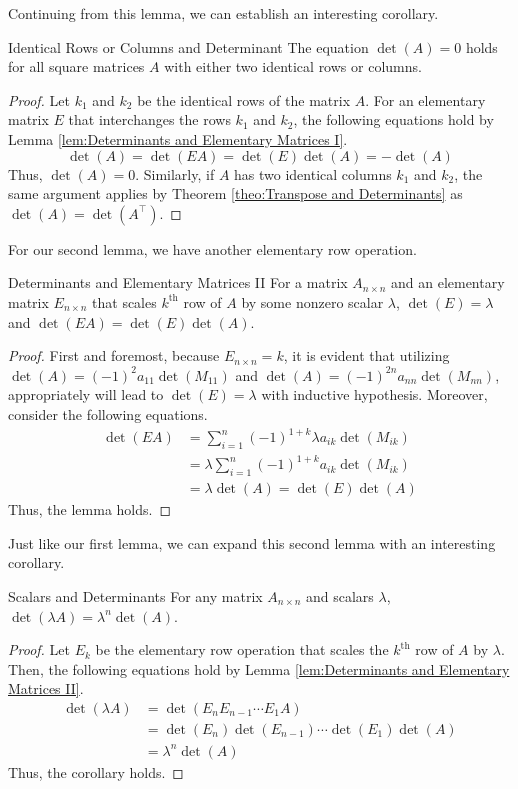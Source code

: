 \documentclass[../main.tex]{subfiles}
\begin{document}
Continuing from this lemma, we can establish an interesting corollary.

\begin{corollary}{Identical Rows or Columns and Determinant}
The equation $\det(A) = 0$ holds for all square matrices $A$ with
either two identical rows or columns.
\end{corollary}
\begin{proof}
Let $k_1$ and $k_2$ be the identical rows of the matrix $A$.
For an elementary matrix $E$ that interchanges the rows $k_1$ and
$k_2$, the following equations hold by Lemma \ref{lem:Determinants
and Elementary Matrices I}.
\[
\det(A)
= \det(EA)
= \det(E) \det(A)
= -\det(A)
\]
Thus, $\det(A) = 0$. Similarly, if $A$ has two identical columns
$k_1$ and $k_2$, the same argument applies by Theorem
\ref{theo:Transpose and Determinants} as $\det(A) =
\det(A^\intercal)$.
\end{proof}

For our second lemma, we have another elementary row operation.

\begin{lemma}{Determinants and Elementary Matrices II}
For a matrix $A_{n \times n}$ and an elementary matrix
$E_{n \times n}$ that scales $k^\text{th}$ row of $A$ by some nonzero
scalar $\lambda$, $\det(E) = \lambda$ and $\det(EA) = \det(E)
\det(A)$.
\end{lemma}
\begin{proof}
First and foremost, because $E_{n \times n} = k$, it is evident
that utilizing $\det(A) = (-1)^2 a_{11} \det(M_{11})$ and $\det(A) =
(-1)^{2n} a_{nn} \det(M_{nn})$, appropriately will lead to $\det(E) =
\lambda$ with inductive hypothesis. Moreover, consider the following
equations.
\begin{align*}
    \det(EA)
    &= \sum_{i=1}^n (-1)^{1+k} \lambda a_{ik} \det(M_{ik}) \\
    &= \lambda \sum_{i=1}^n (-1)^{1+k} a_{ik} \det(M_{ik}) \\
    &= \lambda \det(A) = \det(E) \det(A)
\end{align*}
Thus, the lemma holds.
\end{proof}

Just like our first lemma, we can expand this second lemma with
an interesting corollary.

\begin{corollary}{Scalars and Determinants}
For any matrix $A_{n \times n}$ and scalars $\lambda$,
$\det(\lambda A) = \lambda^n \det(A)$.
\end{corollary}
\begin{proof}
Let $E_k$ be the elementary row operation that scales the
$k^\text{th}$ row of $A$ by $\lambda$. Then, the following equations
hold by Lemma \ref{lem:Determinants and Elementary Matrices II}.
\begin{align*}
    \det(\lambda A)
    &= \det( E_n E_{n-1} \cdots E_1 A) \\
    &= \det(E_n) \det(E_{n-1}) \cdots \det(E_1) \det(A) \\
    &= \lambda^n \det(A)
\end{align*}
Thus, the corollary holds.
\end{proof}
\end{document}
